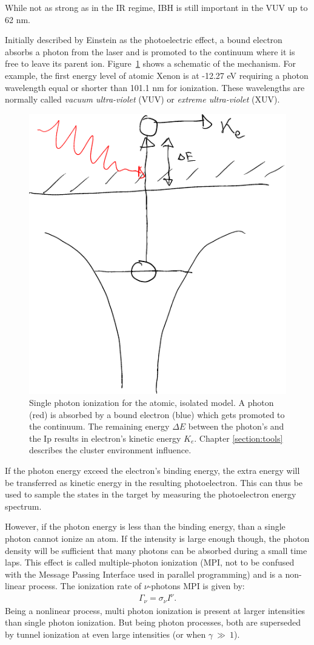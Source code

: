 While not as strong as in the IR regime, IBH is still important in the
VUV\cite{Krainov2000} up to 62 nm\cite{Georgescu2007}.

Initially described by Einstein as the photoelectric effect, a bound electron
absorbs a photon from the laser and is promoted to the continuum where it is
free to leave its parent ion. Figure~\ref{fig:ionization:single} shows a
schematic of the mechanism. For example, the first energy level of atomic
Xenon is at -12.27 eV requiring a photon wavelength equal or shorter than
101.1 nm for ionization. These wavelengths are normally called
\textit{vacuum ultra-violet} (VUV) or \textit{extreme ultra-violet} (XUV).

\begin{figure}
 \centering
 \includegraphics[width=0.38\columnwidth]{figures/mockups/ionization_single}
 \caption{Single photon ionization for the atomic, isolated model. A photon
          (red) is absorbed by a bound electron (blue) which gets promoted to
          the continuum. The remaining energy $\Delta E$ between the photon's
          and the Ip results in electron's kinetic energy $K_e$.
          Chapter \ref{section:tools} describes the cluster environment
          influence.
          }
 \label{fig:ionization:single}
\end{figure}

If the photon energy exceed the electron's binding energy, the extra energy
will be transferred as kinetic energy in the
resulting photoelectron. This can thus be used to sample the states in the
target by measuring the photoelectron energy spectrum\cite{Fennel2010}.

However, if the photon energy is less than the binding energy, than a single
photon cannot ionize an atom. If the intensity is large enough though, the
photon density will be sufficient that many photons can be absorbed during a
small time laps. This effect is called multiple-photon ionization (MPI, not to
be confused with the Message Passing Interface used in parallel programming) and
is a non-linear process. The ionization rate of $\nu$-photons MPI is given
by\cite{Fennel2010}:
\begin{align}
\Gamma_{\nu} = \sigma_{\nu} I^{\nu}.
\label{eqn:ionization:rate:mpi}
\end{align}
Being a nonlinear process, multi photon ionization is present at larger
intensities than single photon ionization. But being photon processes, both are
superseded by tunnel ionization at even large intensities (or when
$\gamma~\gg~1$).





